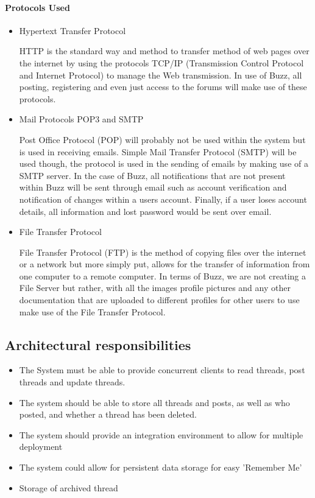 \documentclass[10pt]{article}
\begin{document}
\paragraph{Protocols Used}
\begin{itemize}
\item Hypertext Transfer Protocol

HTTP is the standard way and method to transfer method of web pages over the internet by using the protocols TCP/IP (Transmission Control Protocol and Internet Protocol) to manage the Web transmission. In use of Buzz, all posting, registering and even just access to the forums will make use of these protocols.

\item Mail Protocols POP3 and SMTP

Post Office Protocol (POP) will probably not be used within the system but is used in receiving emails. Simple Mail Transfer Protocol (SMTP) will be used though, the protocol is used in the sending of emails by making use of a SMTP server. In the case of Buzz, all notifications that are not present within Buzz will be sent through email such as account verification and notification of changes within a users account. Finally, if a user loses account details, all information and lost password would be sent over email.

\item File Transfer Protocol

File Transfer Protocol (FTP) is the method of copying files over the internet or a network but more simply put, allows for the transfer of information from one computer to a remote computer. In terms of Buzz, we are not creating a File Server but rather, with all the images profile pictures and any other documentation that are uploaded to different profiles for other users to use make use of the File Transfer Protocol.

\end{itemize}




\clearpage

\subsection{Architectural responsibilities}  %
\begin{itemize}
	\item The System must be able to provide concurrent clients to read threads, post threads and update threads.
	\item The system should be able to store all threads and posts, as well as who posted, and whether a thread has been deleted.
	\item The system should provide an integration environment to allow for multiple deployment
	\item The system could allow for persistent data storage for easy 'Remember Me'
	\item Storage of archived thread
	
\end{itemize}
\clearpage
\end{document}
